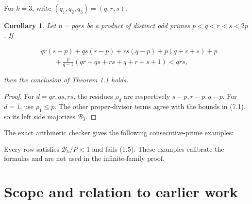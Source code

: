 \documentclass[11pt]{article}
\newtheorem{corollary}[theorem]{Corollary}
\numberwithin{equation}{section}
\begin{document}
For \(k=3\), write \((q_1,q_2,q_3)=(q,r,s)\).

\Needspace{0.28\textheight}
\begin{corollary}

Let \(n=pqrs\) be a product of distinct odd primes
\(p<q<r<s<2p\). If

\nopagebreak[4]
\[
\begin{aligned}
&qr(s-p)+qs(r-p)+rs(q-p)+p(q+r+s)+p\\
&\qquad
+\frac{p}{q-1}(qr+qs+rs+q+r+s+1)
<qrs,
\end{aligned}
\tag{7.1}
\]

then the conclusion of Theorem 1.1 holds.

\end{corollary}

\begin{proof}

For \(d=qr,qs,rs\), the residues \(\rho_d\) are respectively
\(s-p,r-p,q-p\). For \(d=1\), use \(\rho_1\leq p\). The other
proper-divisor terms agree with the bounds in (7.1), so its left side
majorizes \(\mathcal B_3\).
\end{proof}


The exact arithmetic checker gives the following consecutive-prime examples:

\begin{center}
\small
{}
\end{center}


Every row satisfies \(\mathcal B_k/P<1\) and fails (1.5). These examples
calibrate the formulas and are not used in the infinite-family proof.

\section{Scope and relation to earlier work}
\end{document}
